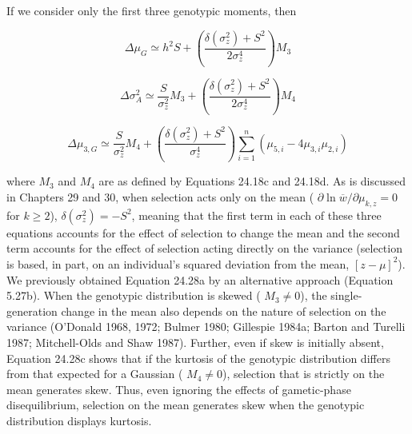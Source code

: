 \documentclass{article}
\begin{document}
If we consider only the first three genotypic moments, then

\begin{equation}
\Delta\mu_{G}\simeq h^{2}S+\left(\frac{\delta(\sigma_{z}^{2})+S^{2}}{2\sigma_{z}^{4}}\right)M_{3}
\tag{24.28a}
\label{eq:24_28a}
\end{equation}

\begin{equation}
\Delta\sigma_{A}^{2}\simeq\frac{S}{\sigma_{z}^{2}}M_{3}+\left(\frac{\delta(\sigma_{z}^{2})+S^{2}}{2\sigma_{z}^{4}}\right)M_{4}
\tag{24.28b}
\label{eq:24_28b}
\end{equation}

\begin{equation}
\Delta\mu_{3,G}\simeq\frac{S}{\sigma_{z}^{2}}M_{4}+\left(\frac{\delta\left(\sigma_{z}^{2}\right)+S^{2}}{\sigma_{z}^{4}}\right)\sum_{i=1}^{n}\left(\mu_{5,i}-4\mu_{3,i}\mu_{2,i}\right)
\tag{24.28c}
\label{eq:24_28c}
\end{equation}

where  $ M_3 $ and  $ M_4 $ are as defined by Equations 24.18c and 24.18d. As is discussed in Chapters 29 and 30, when selection acts only on the mean ( $ \partial \ln \overline{w} / \partial \mu_{k,z} = 0 $ for  $ k \geq 2 $),  $ \delta(\sigma_z^2) = -S^2 $, meaning that the first term in each of these three equations accounts for the effect of selection to change the mean and the second term accounts for the effect of selection acting directly on the variance (selection is based, in part, on an individual's squared deviation from the mean,  $ [z - \mu]^2 $). We previously obtained Equation 24.28a by an alternative approach (Equation 5.27b). When the genotypic distribution is skewed ( $ M_3 \neq 0 $), the single-generation change in the mean also depends on the nature of selection on the variance (O'Donald 1968, 1972; Bulmer 1980; Gillespie 1984a; Barton and Turelli 1987; Mitchell-Olds and Shaw 1987). Further, even if skew is initially absent, Equation 24.28c shows that if the kurtosis of the genotypic distribution differs from that expected for a Gaussian ( $ M_4 \neq 0 $), selection that is strictly on the mean generates skew. Thus, even ignoring the effects of gametic-phase disequilibrium, selection on the mean generates skew when the genotypic distribution displays kurtosis.
\end{document}
